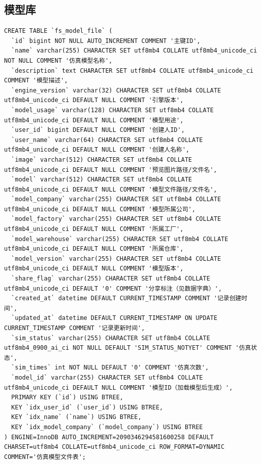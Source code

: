\subsection{模型库}
{\scriptsize
\begin{verbatim}
CREATE TABLE `fs_model_file` (
  `id` bigint NOT NULL AUTO_INCREMENT COMMENT '主键ID',
  `name` varchar(255) CHARACTER SET utf8mb4 COLLATE utf8mb4_unicode_ci NOT NULL COMMENT '仿真模型名称',
  `description` text CHARACTER SET utf8mb4 COLLATE utf8mb4_unicode_ci COMMENT '模型描述',
  `engine_version` varchar(32) CHARACTER SET utf8mb4 COLLATE utf8mb4_unicode_ci DEFAULT NULL COMMENT '引擎版本',
  `model_usage` varchar(128) CHARACTER SET utf8mb4 COLLATE utf8mb4_unicode_ci DEFAULT NULL COMMENT '模型用途',
  `user_id` bigint DEFAULT NULL COMMENT '创建人ID',
  `user_name` varchar(64) CHARACTER SET utf8mb4 COLLATE utf8mb4_unicode_ci DEFAULT NULL COMMENT '创建人名称',
  `image` varchar(512) CHARACTER SET utf8mb4 COLLATE utf8mb4_unicode_ci DEFAULT NULL COMMENT '预览图片路径/文件名',
  `model` varchar(512) CHARACTER SET utf8mb4 COLLATE utf8mb4_unicode_ci DEFAULT NULL COMMENT '模型文件路径/文件名',
  `model_company` varchar(255) CHARACTER SET utf8mb4 COLLATE utf8mb4_unicode_ci DEFAULT NULL COMMENT '模型所属公司',
  `model_factory` varchar(255) CHARACTER SET utf8mb4 COLLATE utf8mb4_unicode_ci DEFAULT NULL COMMENT '所属工厂',
  `model_warehouse` varchar(255) CHARACTER SET utf8mb4 COLLATE utf8mb4_unicode_ci DEFAULT NULL COMMENT '所属仓库',
  `model_version` varchar(255) CHARACTER SET utf8mb4 COLLATE utf8mb4_unicode_ci DEFAULT NULL COMMENT '模型版本',
  `share_flag` varchar(255) CHARACTER SET utf8mb4 COLLATE utf8mb4_unicode_ci DEFAULT '0' COMMENT '分享标注（见数据字典）',
  `created_at` datetime DEFAULT CURRENT_TIMESTAMP COMMENT '记录创建时间',
  `updated_at` datetime DEFAULT CURRENT_TIMESTAMP ON UPDATE CURRENT_TIMESTAMP COMMENT '记录更新时间',
  `sim_status` varchar(255) CHARACTER SET utf8mb4 COLLATE utf8mb4_0900_ai_ci NOT NULL DEFAULT 'SIM_STATUS_NOTYET' COMMENT '仿真状态',
  `sim_times` int NOT NULL DEFAULT '0' COMMENT '仿真次数',
  `model_id` varchar(255) CHARACTER SET utf8mb4 COLLATE utf8mb4_unicode_ci DEFAULT NULL COMMENT '模型ID（加载模型后生成）',
  PRIMARY KEY (`id`) USING BTREE,
  KEY `idx_user_id` (`user_id`) USING BTREE,
  KEY `idx_name` (`name`) USING BTREE,
  KEY `idx_model_company` (`model_company`) USING BTREE
) ENGINE=InnoDB AUTO_INCREMENT=2090346294581600258 DEFAULT CHARSET=utf8mb4 COLLATE=utf8mb4_unicode_ci ROW_FORMAT=DYNAMIC COMMENT='仿真模型文件表';
\end{verbatim}
}

